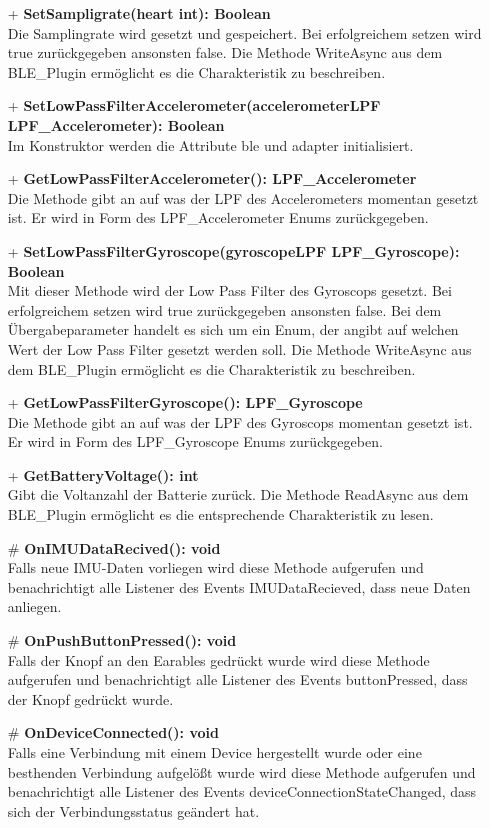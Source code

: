 \documentclass[a4paper,12pt]{article}
\begin{document}
\begin{itemize}
	\item[+] \textbf{SetSampligrate(heart int): Boolean}\\Die Samplingrate wird gesetzt und gespeichert. Bei erfolgreichem setzen wird true zurückgegeben ansonsten false. Die Methode WriteAsync aus dem BLE\_Plugin ermöglicht es die Charakteristik zu beschreiben.
	\item[+] \textbf{SetLowPassFilterAccelerometer(accelerometerLPF LPF\_Accelerometer): Boolean}\\ Im Konstruktor werden die Attribute ble und adapter initialisiert.
	\item[+] \textbf{GetLowPassFilterAccelerometer(): LPF\_Accelerometer}\\ Die Methode gibt an auf was der LPF des Accelerometers momentan gesetzt ist. Er wird in Form des LPF\_Accelerometer Enums zurückgegeben. 
	\item[+] \textbf{SetLowPassFilterGyroscope(gyroscopeLPF LPF\_Gyroscope): Boolean}\\ Mit dieser Methode wird der Low Pass Filter des Gyroscops gesetzt. Bei erfolgreichem setzen wird true zurückgegeben ansonsten false. Bei dem Übergabeparameter handelt es sich um ein Enum, der angibt auf welchen Wert der Low Pass Filter gesetzt werden soll. Die Methode WriteAsync aus dem BLE\_Plugin ermöglicht es die Charakteristik zu beschreiben.
	\item[+] \textbf{GetLowPassFilterGyroscope(): LPF\_Gyroscope}\\Die Methode gibt an auf was der LPF des Gyroscops momentan gesetzt ist. Er wird in Form des LPF\_Gyroscope Enums zurückgegeben. 
	\item[+] \textbf{GetBatteryVoltage(): int}\\ Gibt die Voltanzahl der Batterie zurück. Die Methode ReadAsync aus dem BLE\_Plugin ermöglicht es die entsprechende Charakteristik zu lesen.
	\item[\#] \textbf{OnIMUDataRecived(): void}\\Falls neue IMU-Daten vorliegen wird diese Methode aufgerufen und benachrichtigt alle Listener des Events IMUDataRecieved, dass neue Daten anliegen.
	\item[\#] \textbf{OnPushButtonPressed(): void}\\ Falls der Knopf an den Earables gedrückt wurde wird diese Methode aufgerufen und benachrichtigt alle Listener des Events buttonPressed, dass der Knopf gedrückt wurde.
	\item[\#] \textbf{OnDeviceConnected(): void}\\ Falls eine Verbindung mit einem Device hergestellt wurde oder eine besthenden Verbindung aufgelößt wurde wird diese Methode aufgerufen und benachrichtigt alle Listener des Events deviceConnectionStateChanged, dass sich der Verbindungsstatus geändert hat.
\end{itemize}
\end{document}
